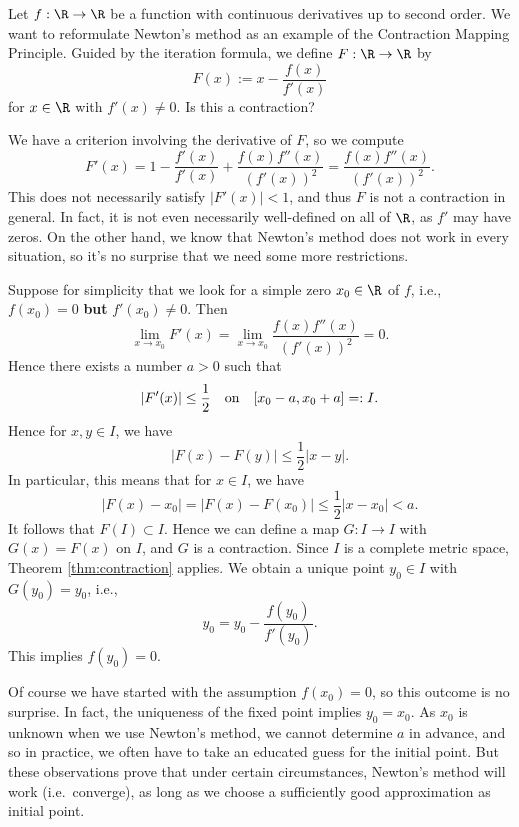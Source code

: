 \begin{example}
Let $f : \R \to \R$ be a function with continuous derivatives up to second order. We want to reformulate Newton's method
as an example of the Contraction Mapping Principle. Guided by the iteration
formula, we define $F : \R \to \R$ by
\[
F(x) := x - \frac{f(x)}{f'(x)}
\]
for $x \in \R$ with $f'(x) \not= 0$. Is this a contraction?

We have a criterion involving the derivative of $F$, so we compute
\[
F'(x) = 1 - \frac{f'(x)}{f'(x)} + \frac{f(x) f''(x)}{(f'(x))^2} = \frac{f(x) f''(x)}{(f'(x))^2}.
\]
This does not necessarily satisfy $|F'(x)| < 1$, and thus $F$ is not
a contraction in general. In fact, it is not even necessarily well-defined on all of
$\R$, as $f'$ may have zeros. 
\nl
On the other hand, we know that
Newton's method does not work in every situation, so it's no surprise
that we need some more restrictions.

Suppose for simplicity that we look for a simple zero $x_0 \in \R$ of
$f$, i.e., $f(x_0) = 0$ \textbf{but} $f'(x_0)\not= 0$. Then
\[
\lim_{x \to x_0}F'(x)= \lim_{x \to x_0}\frac{f(x) f''(x)}{(f'(x))^2}
=0.
\]
Hence there exists a number $a > 0$ such that 
$$|F'(x)| \le \frac{1}{2}
\text{\quad on\quad}
[x_0 - a,x_0 + a]=:I.$$
Hence for $x, y \in I$,
we have
\[
|F(x) - F(y)| \le \frac{1}{2} |x - y|.
\]%
In particular, this means that for $x \in I$,
we have
\[
|F(x) - x_0| = |F(x) - F(x_0)| \le \frac{1}{2} |x - x_0| < a.
\]%
It follows that $F(I) \subset I$.
Hence we can define a map $G :I \to I$
with $G(x) = F(x)$ on $I$, and $G$ is a contraction.
\np
Since $I$ is a complete metric space, Theorem \ref{thm:contraction}
applies. We obtain a unique point $y_0 \in I$ with $G(y_0) = y_0$,
i.e.,
\[
y_0 = y_0 - \frac{f(y_0)}{f'(y_0)}.
\]
This implies $f(y_0) = 0$.

\bis

Of course we have started with the assumption $f(x_0) = 0$, so this outcome
is no surprise. In fact, the uniqueness of the fixed point implies $y_0 = x_0$.
As $x_0$ is unknown when we use Newton's method, we cannot determine $a$
in advance, and so in practice, we often have to take an educated guess
for the initial point. But these observations prove that under certain circumstances,
Newton's method will work (i.e.\ converge), as long as we choose a sufficiently
good approximation as initial point.
\end{example}


